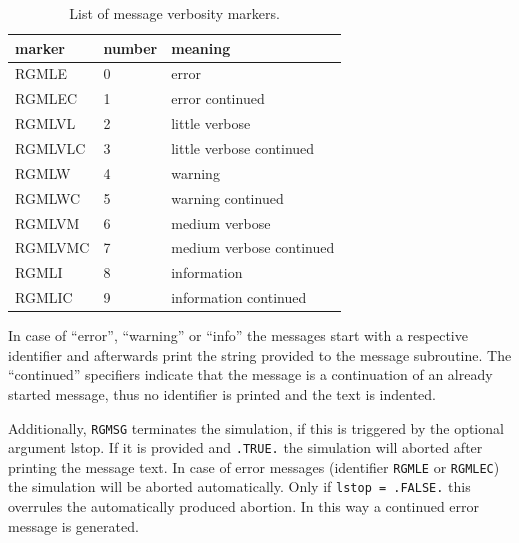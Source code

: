 \documentclass[11pt,twoside]{article}
\begin{document}
\begin{table}
\begin{center}
\begin{tabular}{|llp{8cm}|}\hline
 marker & number & meaning \\ \hline
RGMLE & 0 & error\\
RGMLEC & 1 & error continued\\
RGMLVL & 2 & little verbose\\
RGMLVLC & 3 & little verbose continued\\
RGMLW & 4 & warning \\
RGMLWC & 5 & warning continued\\
RGMLVM & 6 & medium verbose\\
RGMLVMC & 7 & medium verbose continued\\
RGMLI & 8 & information\\
RGMLIC & 9 & information continued\\\hline
\end{tabular}
\caption{List of message verbosity markers. \label{tab_RGM}}
\end{center}
\end{table}
In case of ``error'', ``warning'' or ``info'' the messages start with a
 respective identifier and afterwards print the string provided to the 
message subroutine. 
The ``continued'' specifiers indicate that the message is a continuation of an
already started message, thus no identifier is printed and the text is indented.

Additionally, \verb|RGMSG| terminates the simulation, if this is triggered
by the optional argument lstop. If it is provided and \verb|.TRUE.|
the simulation will aborted after printing the message text.
In case of error messages (identifier \verb|RGMLE| or \verb|RGMLEC|) 
the simulation will be aborted automatically. Only if \verb|lstop = .FALSE.|
this overrules the automatically produced
abortion. In this way a continued error message is generated.
\end{document}
